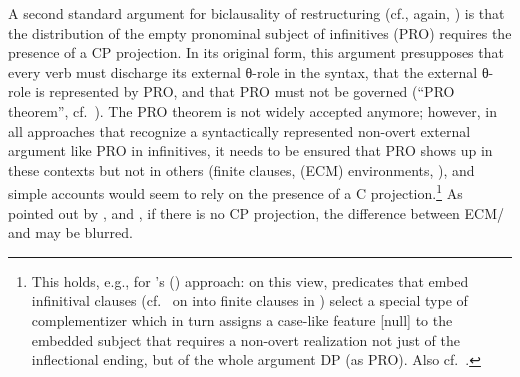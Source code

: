 \documentclass[output=paper]{langsci/langscibook}
\newcommand{\scite}[2]{\citeauthor{#2}#1 (\citeyear{#2})}
\begin{document}
A second standard argument for biclausality of restructuring (cf., again,
\citealt{Stechow&Sternefeld:88}) is that the distribution of the empty
pronominal subject of  infinitives (PRO) requires the presence of a CP
projection.  In its original form, this argument presupposes that every verb
must discharge its external θ-role in the syntax, that the external
θ-role is represented by PRO, and that PRO must not be governed (``PRO
theorem'', cf.\ \citealt{Chomsky:81}). The PRO theorem is not widely accepted
anymore; however, in all approaches that recognize a syntactically represented
non-overt external argument like PRO in  infinitives, it needs to be
ensured that PRO shows up in these contexts but not in others (finite clauses,
 (\gls{ECM}) environments, ), and simple accounts
would seem to rely on the presence of a C projection.\footnote{\label{pro3}This
    holds, e.g., for \scite{'s}{Adger:2003a} approach: on this view, 
    predicates that embed infinitival clauses (cf.\ \citealt{Stiebels:10:inh}
    on  into finite clauses in ) select a special type of
    complementizer which in turn assigns a case-like feature [null] to the
    embedded subject that requires a non-overt realization not just of the
inflectional ending, but of the whole argument DP (as PRO). Also cf.\
\citet{Chomsky&Lasnik:93,Roberts:97:res}.} As pointed out by
\citet{Stechow&Sternefeld:88}, and \citet{Sternefeld:90:pro}, if there is no CP
projection, the difference between \is{exceptional case marking}ECM/ and  may be blurred.\largerpage[2]
\end{document}
